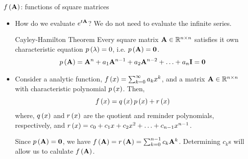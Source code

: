 \documentclass[aspectratio=169]{beamer}
\def\mf{\ensuremath\mathbf}
\def\mb{\ensuremath\mathbb}
\def\lp{\ensuremath\left(}
\def\rp{\ensuremath\right)}
\begin{document}
\begin{frame}{$f\lp\mf{A}\rp$: functions of square matrices}
\begin{itemize}
    \item How do we evaluate $e^{t\mf{A}}$? We do not need to evaluate the infinite series.

    \begin{bclogo}{Cayley-Hamilton Theorem}
    Every square matrix $\mf{A} \in \mb{R}^{n \times n}$ satisfies it own characteristic equation $p\lp \lambda \rp = 0$, i.e. $p\lp\mf{A}\rp = \mf{0}$.
    \[ p\lp\mf{A}\rp = \mf{A}^n + a_1\mf{A}^{n-1} + a_2\mf{A}^{n-2} + \ldots + a_n\mf{I} = \mf{0} \]
    \end{bclogo}

    \item Consider a analytic function, $f\lp x\rp = \sum_{k=0}^\infty a_kx^k$, and a matrix $\mf{A} \in \mb{R}^{n \times n}$ with characteristic polynomial $p\lp x\rp$. Then,
    \[ f\lp x\rp = q\lp x\rp p\lp x\rp + r\lp x\rp \]
    where, $q\lp x\rp$ and $r\lp x\rp$ are the quotient and reminder polynomials, respectively, and $r\lp x\rp = c_0 + c_1x + c_2x^2 + \ldots + c_{n-1}x^{n-1}$.

    Since $p\lp \mf{A}\rp = \mf{0}$, we have $f\lp \mf{A}\rp = r\lp \mf{A}\rp = \sum_{k=0}^{n-1}c_k\mf{A}^k$. Determining $c_k$s will allow us to calulate $f\lp \mf{A}\rp$.
\end{itemize}
\end{frame}
\end{document}
